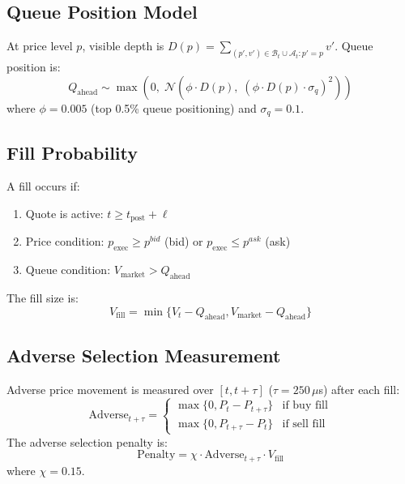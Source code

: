 \documentclass[11pt]{article}
\theoremstyle{definition}
\begin{document}
\subsection{Queue Position Model}

At price level $p$, visible depth is $D(p) = \sum_{(p', v') \in \mathcal{B}_t \cup \mathcal{A}_t : p' = p} v'$. Queue position is:
\begin{equation}
Q_{\text{ahead}} \sim \max\!\left(0,\; \mathcal{N}(\phi \cdot D(p),\; (\phi \cdot D(p) \cdot \sigma_q)^2)\right)
\end{equation}
where $\phi = 0.005$ (top 0.5\% queue positioning) and $\sigma_q = 0.1$.

\subsection{Fill Probability}

A fill occurs if:
\begin{enumerate}
\item Quote is active: $t \geq t_{\text{post}} + \ell$
\item Price condition: $p_{\text{exec}} \geq p^{bid}$ (bid) or $p_{\text{exec}} \leq p^{ask}$ (ask)
\item Queue condition: $V_{\text{market}} > Q_{\text{ahead}}$
\end{enumerate}
The fill size is:
\begin{equation}
V_{\text{fill}} = \min\{V_t - Q_{\text{ahead}}, V_{\text{market}} - Q_{\text{ahead}}\}
\end{equation}

\subsection{Adverse Selection Measurement}

Adverse price movement is measured over $[t, t+\tau]$ ($\tau = 250\,\mu$s) after each fill:
\begin{equation}
\text{Adverse}_{t+\tau} = \begin{cases}
\max\{0, P_t - P_{t+\tau}\} & \text{if buy fill} \\
\max\{0, P_{t+\tau} - P_t\} & \text{if sell fill}
\end{cases}
\end{equation}
The adverse selection penalty is:
\begin{equation}
\text{Penalty} = \chi \cdot \text{Adverse}_{t+\tau} \cdot V_{\text{fill}}
\end{equation}
where $\chi = 0.15$.
\end{document}
